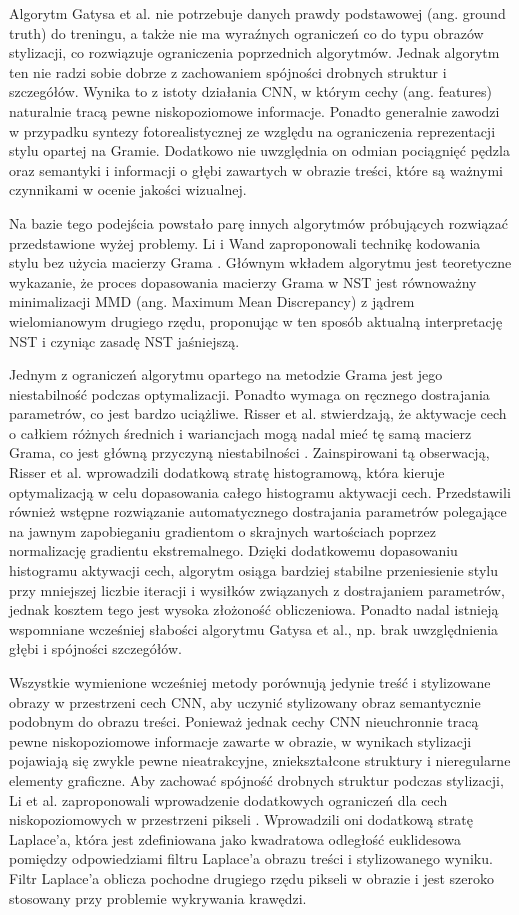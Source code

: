 \documentclass[12pt]{article}
\begin{document}
Algorytm Gatysa et al. nie potrzebuje danych prawdy podstawowej (ang. ground truth) do treningu, a także nie ma wyraźnych ograniczeń co do typu obrazów stylizacji, co rozwiązuje ograniczenia poprzednich algorytmów. Jednak algorytm ten nie radzi sobie dobrze z zachowaniem spójności drobnych struktur i szczegółów. Wynika to z istoty działania CNN, w którym cechy (ang. features) naturalnie tracą pewne niskopoziomowe informacje. Ponadto generalnie zawodzi w przypadku syntezy fotorealistycznej ze względu na ograniczenia reprezentacji stylu opartej na Gramie. Dodatkowo nie uwzględnia on odmian pociągnięć pędzla oraz semantyki i informacji o głębi zawartych w obrazie treści, które są ważnymi czynnikami w ocenie jakości wizualnej.

Na bazie tego podejścia powstało parę innych algorytmów próbujących rozwiązać przedstawione wyżej problemy. Li i Wand zaproponowali technikę kodowania stylu bez użycia macierzy Grama \cite{38}. Głównym wkładem algorytmu jest teoretyczne wykazanie, że proces dopasowania macierzy Grama w NST jest równoważny minimalizacji MMD (ang. Maximum Mean Discrepancy) z jądrem wielomianowym drugiego rzędu, proponując w ten sposób aktualną interpretację NST i czyniąc zasadę NST jaśniejszą.

Jednym z ograniczeń algorytmu opartego na metodzie Grama jest jego niestabilność podczas optymalizacji. Ponadto wymaga on ręcznego dostrajania parametrów, co jest bardzo uciążliwe. Risser et al. stwierdzają, że aktywacje cech o całkiem różnych średnich i wariancjach mogą nadal mieć tę samą macierz Grama, co jest główną przyczyną niestabilności \cite{36}. Zainspirowani tą obserwacją, Risser et al. wprowadzili dodatkową stratę histogramową, która kieruje optymalizacją w celu dopasowania całego histogramu aktywacji cech. Przedstawili również wstępne rozwiązanie automatycznego dostrajania parametrów polegające na jawnym zapobieganiu gradientom o skrajnych wartościach poprzez normalizację gradientu ekstremalnego. Dzięki dodatkowemu dopasowaniu histogramu aktywacji cech, algorytm osiąga bardziej stabilne przeniesienie stylu przy mniejszej liczbie iteracji i wysiłków związanych z dostrajaniem parametrów, jednak kosztem tego jest wysoka złożoność obliczeniowa. Ponadto nadal istnieją wspomniane wcześniej słabości algorytmu Gatysa et al., np. brak uwzględnienia głębi i spójności szczegółów.

Wszystkie wymienione wcześniej metody porównują jedynie treść i stylizowane obrazy w przestrzeni cech CNN, aby uczynić stylizowany obraz semantycznie podobnym do obrazu treści. Ponieważ jednak cechy CNN nieuchronnie tracą pewne niskopoziomowe informacje zawarte w obrazie, w wynikach stylizacji pojawiają się zwykle pewne nieatrakcyjne, zniekształcone struktury i nieregularne elementy graficzne. Aby zachować spójność drobnych struktur podczas stylizacji, Li et al. zaproponowali wprowadzenie dodatkowych ograniczeń dla cech niskopoziomowych w przestrzeni pikseli \cite{37}. Wprowadzili oni dodatkową stratę Laplace’a, która jest zdefiniowana jako kwadratowa odległość euklidesowa pomiędzy odpowiedziami filtru Laplace’a obrazu treści i stylizowanego wyniku. Filtr Laplace’a oblicza pochodne drugiego rzędu pikseli w obrazie i jest szeroko stosowany przy problemie wykrywania krawędzi.
\end{document}
